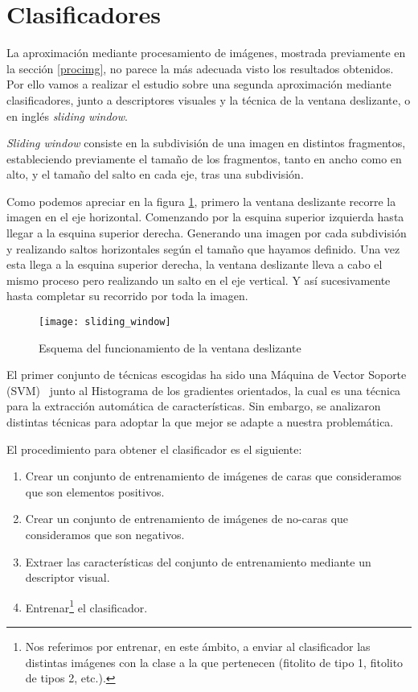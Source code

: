\section{Clasificadores}

La aproximación mediante procesamiento de imágenes, mostrada previamente en la sección \ref{procimg}, no parece la más adecuada visto los resultados obtenidos. Por ello vamos a realizar el estudio sobre una segunda aproximación  mediante clasificadores, junto a descriptores visuales y la técnica de la ventana deslizante, o en inglés \textit{sliding window}.

\textit{Sliding window} consiste en la subdivisión de una imagen en distintos fragmentos, estableciendo previamente el tamaño de los fragmentos, tanto en ancho como en alto, y el tamaño del salto en cada eje, tras una subdivisión. 

Como podemos apreciar en la figura \ref{fig:sliding_window}, primero la ventana deslizante recorre la imagen en el eje horizontal. Comenzando por la esquina superior izquierda hasta llegar a la esquina superior derecha. Generando una imagen por cada subdivisión y realizando saltos horizontales según el tamaño que hayamos definido. Una vez esta llega a la esquina superior derecha, la ventana deslizante lleva a cabo el mismo proceso pero realizando un salto en el eje vertical. Y así sucesivamente hasta completar su recorrido por toda la imagen.

\begin{figure}
\centering
\texttt{[image: sliding\_window]}
\caption[Esquema del funcionamiento de la ventana deslizante]{Esquema del funcionamiento de la ventana deslizante~\cite{jcp}}
\label{fig:sliding_window}
\end{figure}

El primer conjunto de técnicas escogidas ha sido una Máquina de Vector Soporte (SVM)~\cite{svm} junto al Histograma de los gradientes orientados, la cual es una técnica para la extracción automática de características. Sin embargo, se analizaron distintas técnicas para adoptar la que mejor se adapte a nuestra problemática.

El procedimiento para obtener el clasificador es el siguiente:

\begin{enumerate}[1.]
  \item Crear un conjunto de entrenamiento de imágenes de caras que consideramos que son elementos positivos.
  \item Crear un conjunto de entrenamiento de imágenes de no-caras que consideramos que son negativos.
  \item Extraer las características del conjunto de entrenamiento  mediante un descriptor visual.
  \item Entrenar\footnote{Nos referimos por entrenar, en este ámbito, a enviar al clasificador las distintas imágenes con la clase a la que pertenecen (fitolito de tipo 1, fitolito de tipos 2, etc.).} el clasificador.
\end{enumerate}

